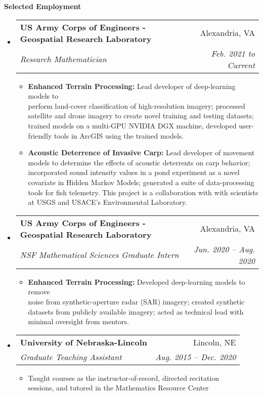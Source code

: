 \documentclass[letterpaper,11pt]{article}
\makeatletter
\newcommand{\resitem}[1]{\item #1 \vspace{-2pt}}
\newcommand{\resheading}[1]{{\large \colorbox{mygrey}{\begin{minipage}{\textwidth}{\textbf{#1 \vphantom{p\^{E}}}}\end{minipage}}}}
\newcommand{\ressubheading}[4]{
\begin{tabular*}{6.5in}{l@{\extracolsep{\fill}}r}
		\textbf{#1} & #2 \\
		\textit{#3} & \textit{#4} \\
\end{tabular*}\vspace{-6pt}}
\makeatother
\begin{document}
\resheading{Selected Employment}
	\begin{itemize}
		\item
		\ressubheading{US Army Corps of Engineers - Geospatial Research Laboratory}{Alexandria, VA}{Research Mathematician}{Feb. 2021 to Current}
		{\footnotesize
			\begin{itemize}
				\resitem{\textbf{Enhanced Terrain Processing:} Lead developer of deep-learning models to \\ perform land-cover classification of high-resolution imagery; processed satellite and drone imagery to create novel training and testing datasets; trained models on a multi-GPU NVIDIA DGX machine, developed user-friendly tools in ArcGIS using the trained models.}
				\resitem{\textbf{Acoustic Deterrence of Invasive Carp:} Lead developer of movement models to determine the effects of acoustic deterrents on carp behavior; incorporated sound intensity values in a pond experiment as a novel covariate in Hidden Markov Models; generated a suite of data-processing tools for fish telemetry. This project is a collaboration with with scientists at USGS and USACE's Environmental Laboratory.}
			\end{itemize}
		}
	
	\newpage
	
		\item
		\ressubheading{US Army Corps of Engineers - Geospatial Research Laboratory}{Alexandria, VA}{NSF Mathematical Sciences Graduate Intern}{Jun. 2020 -- Aug. 2020}
		{\footnotesize
			\begin{itemize}
				\resitem{\textbf{Enhanced Terrain Processing:} Developed deep-learning models to remove \\ noise from synthetic-aperture radar (SAR) imagery; created synthetic datasets from publicly available imagery; acted as technical lead with minimal oversight from mentors.}
		\end{itemize}}

		\item
			{\ressubheading{University of Nebraska-Lincoln}{Lincoln, NE}{Graduate Teaching Assistant}{Aug. 2015 -- Dec. 2020}
				{ \footnotesize
				\begin{itemize}
					\resitem{Taught courses as the instructor-of-record, directed recitation \\ sessions, and tutored in the Mathematics Resource Center}
				\end{itemize}}}


\end{itemize}
\end{document}
